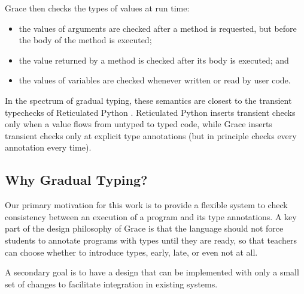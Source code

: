 Grace then checks the types of values at run time:
%
\begin{itemize}
\item the values of arguments are checked after a method is requested, 
      but before the body of the method is executed;
\item the value returned by a method is checked after its body is executed; and
\item the values of variables are checked
      whenever written or read by user code.
\end{itemize}
%
%
%
%
In the spectrum of gradual typing, these semantics are
closest to the
transient typechecks of Reticulated Python
\cite{reticPython2014,Greenman2018}.
Reticulated Python inserts transient checks only when a value flows from untyped
to typed code, while Grace inserts transient checks only at explicit type
annotations (but in principle checks every annotation every time).



\subsection{Why Gradual Typing?}


Our primary motivation for this work
is to provide a flexible system 
to check consistency between an execution of a program
and its type annotations.
 A key part of the design philosophy of Grace is that the language should not force
 students to annotate programs with types until they are ready, so that
 teachers can choose whether to introduce types, early, late, or even
 not at all. 

A secondary goal is to have a design that can be implemented with
only a small set of changes to facilitate integration in existing systems.


